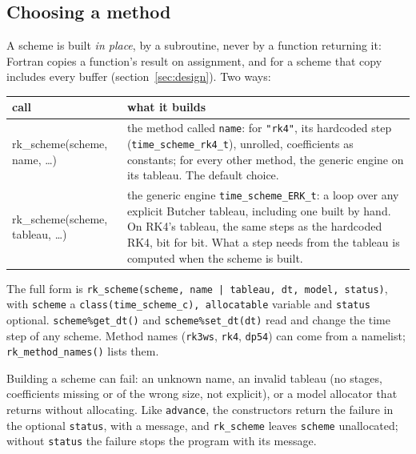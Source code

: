 \documentclass[11pt,a4paper]{article}
\newcommand{\code}[1]{\texttt{#1}}
\begin{document}
\subsection{Choosing a method}

A scheme is built \emph{in place}, by a subroutine, never by a function
returning it: Fortran copies a function's result on assignment, and for a
scheme that copy includes every buffer (section~\ref{sec:design}). Two ways:
\begin{center}
\renewcommand{\arraystretch}{1.25}
\begin{tabular}{>{\ttfamily}l p{8.4cm}}
  \toprule
  \normalfont call & what it builds \\
  \midrule
  rk\_scheme(scheme, name, \dots)    & the method called \code{name}: for \code{"rk4"}, its
                                                   hardcoded step (\code{time\_scheme\_rk4\_t}), unrolled,
                                                   coefficients as constants; for every other method, the
                                                   generic engine on its tableau. The default choice. \\
  rk\_scheme(scheme, tableau, \dots) & the generic engine \code{time\_scheme\_ERK\_t}: a loop
                                                   over any explicit Butcher tableau, including one built
                                                   by hand. On RK4's tableau, the same steps as the
                                                   hardcoded RK4, bit for bit. What a step needs from the
                                                   tableau is computed when the scheme is built. \\
  \bottomrule
\end{tabular}
\end{center}
The full form is \code{rk\_scheme(scheme, name\,|\,tableau, dt, model,
status)}, with \code{scheme} a \code{class(time\_scheme\_c), allocatable}
variable and \code{status} optional.
\code{scheme\%get\_dt()} and \code{scheme\%set\_dt(dt)} read and change the
time step of any scheme.
Method names (\code{rk3ws}, \code{rk4}, \code{dp54}) can come from a
namelist; \code{rk\_method\_names()} lists them.

Building a scheme can fail: an unknown name, an invalid tableau (no stages,
coefficients missing or of the wrong size, not explicit), or a model allocator
that returns without allocating. Like \code{advance}, the constructors return
the failure in the optional \code{status}, with a message, and \code{rk\_scheme}
leaves \code{scheme} unallocated; without \code{status} the failure
stops the program with its message.
\end{document}
